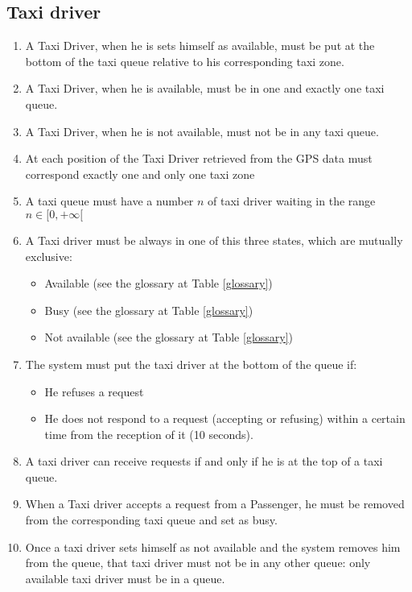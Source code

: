\subsection{Taxi driver}
\begin{enumerate}
\item A Taxi Driver, when he is sets himself as available, must be put at the bottom of the taxi queue relative to his corresponding taxi zone.
\item A Taxi Driver, when he is available, must be in one and exactly one taxi queue.
\item A Taxi Driver, when he is not available, must not be in any taxi queue.
\item At each position of the Taxi Driver retrieved from the GPS data must correspond exactly one and only one taxi zone
\item A taxi queue must have a number $n$ of taxi driver waiting in the range $n\in[0,+\infty[$
\item A Taxi driver must be always in one of this three states, which are mutually exclusive:
\begin{itemize}
	\item Available (see the glossary at Table \ref{glossary})
	\item Busy (see the glossary at Table \ref{glossary})
	\item Not available	(see the glossary at Table \ref{glossary})
\end{itemize}
\item The system must put the taxi driver at the bottom of the queue if:
\begin{itemize}
	\item He refuses a request
	\item He does not respond to a request (accepting or refusing) within a certain time from the reception of it (10 seconds).
\end{itemize}
\item A taxi driver can receive requests if and only if he is at the top of a taxi queue.
\item When a Taxi driver accepts a request from a Passenger, he must be removed from the corresponding taxi queue and set as busy.
\item Once a taxi driver sets himself as not available and the system removes him from the queue, that taxi driver must not be in any other queue: only available taxi driver must be in a queue.
\end{enumerate}